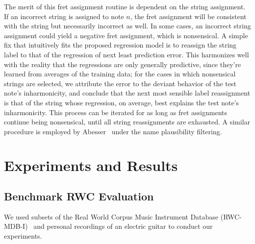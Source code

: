 \documentclass[12pt]{cmuthesis}
\begin{document}
The merit of this fret assignment routine is dependent on the string assignment. If an incorrect string is assigned to note $n$, the fret assignment will be consistent with the string but necessarily incorrect as well. In some cases, an incorrect string assignment could yield a negative fret assignment, which is nonsensical. A simple fix that intuitively fits the proposed regression model is to reassign the string label to that of the regression of next least prediction error. This harmonizes well with the reality that the regressions are only generally predictive, since they're learned from averages of the training data; for the cases in which nonsensical strings are selected, we attribute the error to the deviant behavior of the test note's inharmonicity, and conclude that the next most sensible label reassignment is that of the string whose regression, on average, best explains the test note's inharmonicity. This process can be iterated for as long as fret assignments continue being nonsensical, until all string reassignments are exhausted. A similar procedure is employed by Abesser~\cite{abesser2012} under the name plausibility filtering.




\noindent
\chapter{Experiments and Results}
\label{experiments}
\section{Benchmark RWC Evaluation}

We used subsets of the Real World Corpus Music Instrument Database (RWC-MDB-I)~\cite{goto2003} and personal recordings of an electric guitar to conduct our experiments. 
\end{document}
